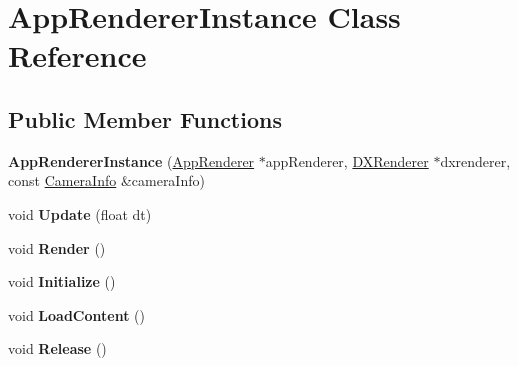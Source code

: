 \hypertarget{classAppRendererInstance}{}\section{App\+Renderer\+Instance Class Reference}
\label{classAppRendererInstance}
\subsection*{Public Member Functions}
\begin{DoxyCompactItemize}
\item 
\mbox{\label{classAppRendererInstance_a515b2caf02195a031e72d2c6e2763e33}} 
{\bfseries App\+Renderer\+Instance} (\hyperlink{classAppRenderer}{App\+Renderer} $\ast$app\+Renderer, \hyperlink{classDXRenderer}{D\+X\+Renderer} $\ast$dxrenderer, const \hyperlink{structCameraInfo}{Camera\+Info} \&camera\+Info)
\item 
\mbox{\label{classAppRendererInstance_add1e6dadf22e4f6c37c5ff2d3a0139ea}} 
void {\bfseries Update} (float dt)
\item 
\mbox{\label{classAppRendererInstance_af812f24fea366355d8c8f0932fdc05f8}} 
void {\bfseries Render} ()
\item 
\mbox{\label{classAppRendererInstance_a7ef8162fb5bed1b3b5151fc9478fe393}} 
void {\bfseries Initialize} ()
\item 
\mbox{\label{classAppRendererInstance_ac33e5065fc392f5d948e5c5ed3b41e67}} 
void {\bfseries Load\+Content} ()
\item 
\mbox{\label{classAppRendererInstance_aa08022e4f7a93586ad0017b024b30265}} 
void {\bfseries Release} ()
\end{DoxyCompactItemize}
